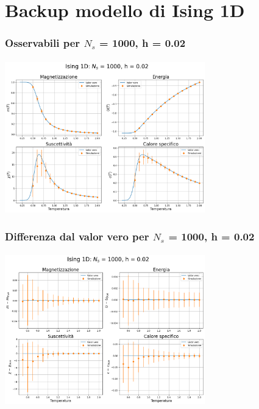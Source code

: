 \section{Backup modello di Ising 1D}

\begin{frame}
    \frametitle{Osservabili per $N_s$ = 1000, h = 0.02}
    \framesubtitle{}

    \centering
    \includegraphics[width=0.65\textwidth]{Immagini/backupIsing1D/obs_1000_0.02.png}

\end{frame}



\begin{frame}
    \frametitle{Differenza dal valor vero per $N_s$ = 1000, h = 0.02}
    \framesubtitle{}

    \centering
    \includegraphics[width=0.65\textwidth]{Immagini/backupIsing1D/obs_1000_0.02_diff.png}

\end{frame}



